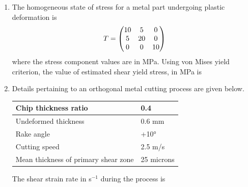 \documentclass[journal,12pt,onecolumn]{IEEEtran}
\begin{document}
\begin{enumerate}[resume]

    \item The homogeneous state of stress for a metal part undergoing plastic deformation is
          \[T = \begin{pmatrix}10 & 5 & 0 \\ 5 & 20 & 0 \\ 0 & 0 & 10\end{pmatrix}\]
          where the stress component values are in MPa. Using von Mises yield criterion, the value of estimated shear yield stress, in MPa is

          \begin{enumerate}
          \end{enumerate}

    \item Details pertaining to an orthogonal metal cutting process are given below.

          \begin{table}[H]
              \centering
              \begin{tabular}{|l|l|}
                  \hline
                  Chip thickness ratio                 & 0.4        \\
                  \hline
                  Undeformed thickness                 & 0.6 mm     \\
                  \hline
                  Rake angle                           & +10°       \\
                  \hline
                  Cutting speed                        & 2.5 m/s    \\
                  \hline
                  Mean thickness of primary shear zone & 25 microns \\
                  \hline
              \end{tabular}
          \end{table}

          The shear strain rate in s$^{-1}$ during the process is

          \begin{enumerate}
          \end{enumerate}


\end{enumerate}
\end{document}
